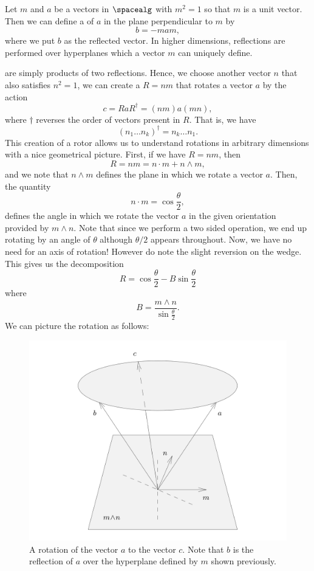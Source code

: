 Let $m$ and $a$ be a vectors in $\spacealg$ with $m^2 = 1$ so that $m$ is a unit vector.  Then we can define a  of $a$ in the plane perpendicular to $m$ by
\[
b=-mam,
\]
where we put $b$ as the reflected vector. In higher dimensions, reflections are performed over hyperplanes which a vector $m$ can uniquely define. 

 are simply products of two reflections.  Hence, we choose another vector $n$ that also satisfies $n^2=1$, we can create a  $R=nm$ that rotates a vector $a$ by the action
\[
c = RaR^\dagger = (nm)a(mn),
\]
where $\dagger$ reverses the order of vectors present in $R$. That is, we have
\[
(n_1 \dots n_k)^\dagger = n_k \dots n_1.
\]
This creation of a rotor allows us to understand rotations in arbitrary dimensions with a nice geometrical picture.  First, if we have $R=nm$, then
\[
R = nm = n\cdot m + n\wedge m,
\]
and we note that $n\wedge m$ defines the plane in which we rotate a vector $a$.  Then, the quantity
\[
n\cdot m = \cos \frac{\theta}{2},
\]
defines the angle in which we rotate the vector $a$ in the given orientation provided by $m\wedge n$.  Note that since we perform a two sided operation, we end up rotating by an angle of $\theta$ although $\theta/2$ appears throughout. Now, we have no need for an axis of rotation! However do note the slight reversion on the wedge. This gives us the decomposition
\[
R=\cos \frac{\theta}{2} - B \sin \frac{\theta}{2}
\]
where
\[
B=\frac{m\wedge n}{\sin \frac{\theta}{2}}.
\]
We can picture the rotation as follows:
\begin{figure}[H]
    \centering
    \includegraphics[width=.8\textwidth]{geometric_algebra_calculus/figures/rotation.png}
    \caption{A rotation of the vector $a$ to the vector $c$. Note that $b$ is the reflection of $a$ over the hyperplane defined by $m$ shown previously.}
    \label{fig:rotors}
\end{figure}

